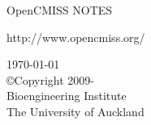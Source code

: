 \thispagestyle{empty}

\begin{center}
   \huge OpenCMISS NOTES
   \vspace{10mm}   

   \large http://www.opencmiss.org/

   \vspace{40mm}   

   \vspace{5mm}
   \today\\   %
   \vspace{20mm}
   \small
   \copyright \thickspace Copyright 2009-\\
   Bioengineering Institute\\
   The University of Auckland
\end{center}





